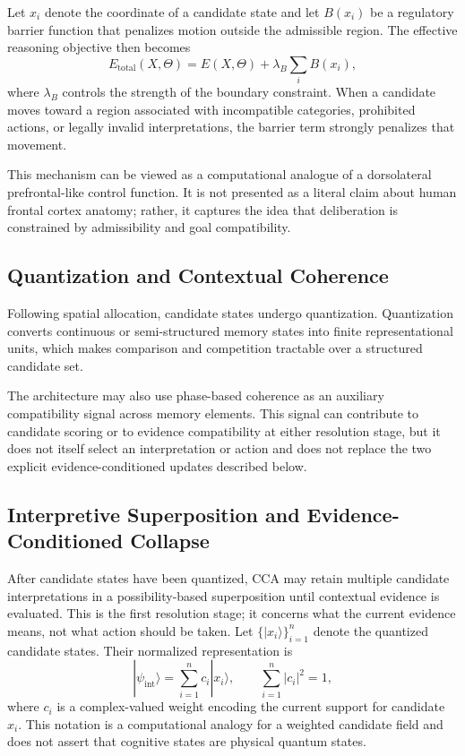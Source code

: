 \documentclass[10pt,journal,compsoc]{IEEEtran}
\begin{document}
Let $x_i$ denote the coordinate of a candidate state and let $B(x_i)$ be a regulatory barrier function that penalizes motion outside the admissible region. The effective reasoning objective then becomes
\[
E_{\text{total}}(X,\Theta) = E(X,\Theta) + \lambda_B \sum_i B(x_i),
\]
where $\lambda_B$ controls the strength of the boundary constraint. When a candidate moves toward a region associated with incompatible categories, prohibited actions, or legally invalid interpretations, the barrier term strongly penalizes that movement.

This mechanism can be viewed as a computational analogue of a dorsolateral prefrontal-like control function. It is not presented as a literal claim about human frontal cortex anatomy; rather, it captures the idea that deliberation is constrained by admissibility and goal compatibility.

\subsection{Quantization and Contextual Coherence}

Following spatial allocation, candidate states undergo quantization. Quantization converts continuous or semi-structured memory states into finite representational units, which makes comparison and competition tractable over a structured candidate set.

The architecture may also use phase-based coherence as an auxiliary compatibility signal across memory elements. This signal can contribute to candidate scoring or to evidence compatibility at either resolution stage, but it does not itself select an interpretation or action and does not replace the two explicit evidence-conditioned updates described below.

\subsection{Interpretive Superposition and Evidence-Conditioned Collapse}

After candidate states have been quantized, CCA may retain multiple candidate interpretations in a possibility-based superposition until contextual evidence is evaluated. This is the first resolution stage; it concerns what the current evidence means, not what action should be taken. Let $\{|x_i\rangle\}_{i=1}^{n}$ denote the quantized candidate states. Their normalized representation is
\[
|\psi_{\mathrm{int}}\rangle = \sum_{i=1}^{n} c_i |x_i\rangle,
\qquad \sum_{i=1}^{n}|c_i|^2=1,
\]
where $c_i$ is a complex-valued weight encoding the current support for candidate $x_i$. This notation is a computational analogy for a weighted candidate field and does not assert that cognitive states are physical quantum states.
\end{document}
